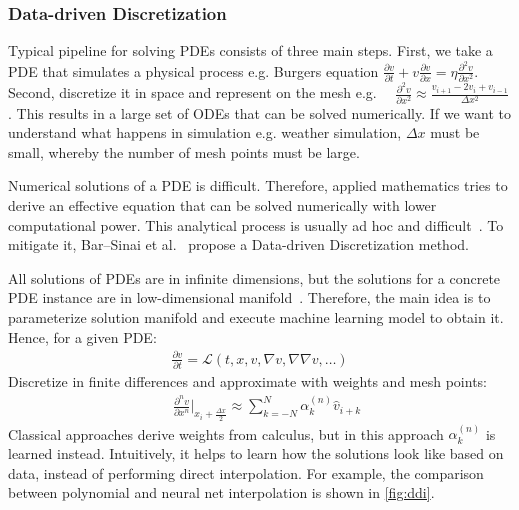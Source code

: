 \subsubsection{Data-driven Discretization}
Typical pipeline for solving PDEs consists of three main steps. First, we take a PDE that simulates a physical process e.g. Burgers equation $\frac{\partial v}{\partial t}+v \frac{\partial v}{\partial x}=\eta \frac{\partial^{2} v}{\partial x^{2}}$. Second, discretize it in space and represent on the mesh e.g. $\quad \frac{\partial^{2} v}{\partial x^{2}} \approx \frac{v_{i+1}-2 v_{i}+v_{i-1}}{\Delta x^{2}}$. This results in a large set of ODEs that can be solved numerically. If we want to understand what happens in simulation e.g. weather simulation, $\Delta x$ must be small, whereby the number of mesh points must be large. 

Numerical solutions of a PDE is difficult. Therefore, applied mathematics tries to derive an effective equation that can be solved numerically with lower computational power. This analytical process is usually ad hoc and difficult~\cite{brennerLecture}. To mitigate it, Bar--Sinai et al.~\cite{Brenner19} propose a Data-driven Discretization method.

All solutions of PDEs are in infinite dimensions, but the solutions for a concrete PDE instance are in low-dimensional manifold~\cite{titi89}. Therefore, the main idea is to parameterize solution manifold and execute machine learning model to obtain it. Hence, for a given PDE:
\begin{equation}
    \begin{array}{l}\frac{\partial v}{\partial t}=\mathcal{L}(t, x, v, \nabla v, \nabla \nabla v, \ldots) \end{array}
    \label{eq:ddd1}
\end{equation}
Discretize in finite differences and approximate with weights and mesh points:
\begin{equation}
    \begin{array}{l}\quad \frac{\partial^{n} v}{\partial x^{n}}|_{x_{i}+\frac{\Delta x}{2}} \approx \sum_{k=-N}^{N} \alpha_{k}^{(n)} \hat{v}_{i+k} \end{array}
    \label{eq:ddd2}
\end{equation}
Classical approaches derive weights from calculus, but in this approach ${\alpha}_{k}^{(n)}$ is learned instead. Intuitively, it helps to learn how the solutions look like based on data, instead of performing direct interpolation. For example, the comparison between polynomial and neural net interpolation is shown in \cref{fig:ddi}.

